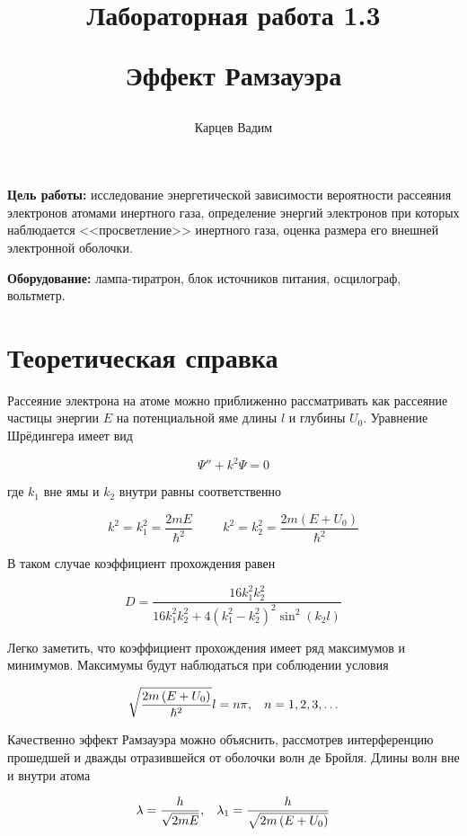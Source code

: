 \documentclass[12pt]{article}
\author{Карцев Вадим}
\title{Лабораторная работа 1.3

Эффект Рамзауэра}
\begin{document}
  \maketitle

  \textbf{Цель работы:} исследование энергетической зависимости вероятности
  рассеяния электронов атомами инертного газа, определение энергий электронов
  при которых наблюдается <<просветление>> инертного газа, оценка размера его
  внешней электронной оболочки.

  \textbf{Оборудование:} лампа-тиратрон, блок источников питания, осцилограф,
  вольтметр.

  \section{Теоретическая справка}

    Рассеяние электрона на атоме можно приближенно рассматривать как рассеяние
    частицы энергии $E$ на потенциальной яме длины $l$ и глубины $U_0$.
    Уравнение Шрёдингера имеет вид

    $$
      \Psi'' + k^2 \Psi = 0
    $$

    где $k_1$ вне ямы и $k_2$ внутри равны соответственно

    $$
      k^2 = k_1^2 = \frac{2 m E}{\hbar^2}
      \hspace{1cm}
      k^2 = k_2^2 = \frac{2 m \left(E + U_0\right)}{\hbar^2}
    $$

    В таком случае коэффициент прохождения равен

    $$
      D = \frac{16 k_1^2 k_2^2}{16 k_1^2 k_2^2 + 4 \left(k_1^2 - k_2^2\right)^2
      \sin^2 \left(k_2 l\right)}
    $$

    Легко заметить, что коэффициент прохождения имеет ряд максимумов и минимумов.
    Максимумы будут наблюдаться при соблюдении условия

    \begin{equation}
      \sqrt{\frac{2 m \left(E + U_0\right)}{\hbar^2}} l = n \pi, \hspace{0.3cm}
      n = 1, 2, 3, \ldots
      \label{eq:maximums}
    \end{equation}

    Качественно эффект Рамзауэра можно объяснить, рассмотрев интерференцию
    прошедшей и дважды отразившейся от оболочки волн де Бройля. Длины волн вне и
    внутри атома

    $$
      \lambda = \frac{h}{\sqrt{2 m E}}, \hspace{0.3cm}
      \lambda_1 = \frac{h}{\sqrt{2 m \left(E + U_0\right)}}
    $$
\end{document}
